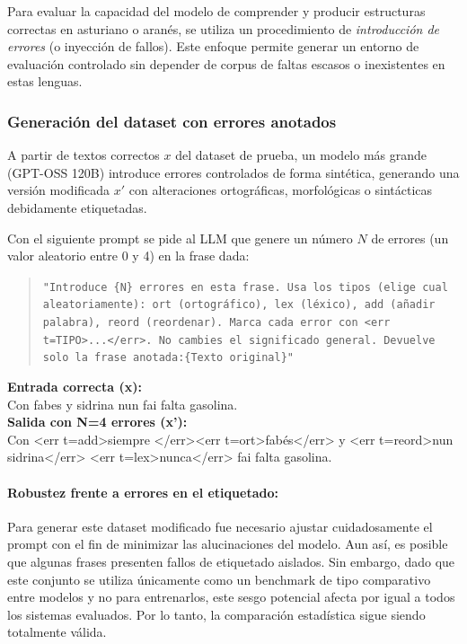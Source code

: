 Para evaluar la capacidad del modelo de comprender y producir estructuras correctas en asturiano o aranés, se utiliza un procedimiento de \emph{introducción de errores} (o inyección de fallos). Este enfoque permite generar un entorno de evaluación controlado sin depender de corpus de faltas escasos o inexistentes en estas lenguas.

\subsubsection{Generación del dataset con errores anotados} 

A partir de textos correctos $x$ del dataset de prueba, un modelo más grande (GPT-OSS 120B) \cite{openai2025gptoss120bgptoss20bmodel} introduce errores controlados de forma sintética, generando una versión modificada $x'$ con alteraciones ortográficas, morfológicas o sintácticas debidamente etiquetadas.

Con el siguiente prompt se pide al LLM que genere un número $N$ de errores (un valor aleatorio entre 0 y 4) en la frase dada:

\begin{quote}
\texttt{"Introduce \{N\} errores en esta frase. Usa los tipos (elige cual aleatoriamente): ort (ortográfico), lex (léxico), add (añadir palabra), reord (reordenar). Marca cada error con <err t=TIPO>...</err>. No cambies el significado general. Devuelve solo la frase anotada:\{Texto original\}"}
\end{quote}

\begin{tcolorbox}[colback=gray!5,colframe=gray!40, title={Ejemplo de transformación con \emph{error injection}}]
\textbf{Entrada correcta (x):}\\
Con fabes y sidrina nun fai falta gasolina.\\

\textbf{Salida con N=4 errores (x'):}\\
Con <err t=add>siempre </err><err t=ort>fabés</err> y <err t=reord>nun sidrina</err> <err t=lex>nunca</err> fai falta gasolina.
\end{tcolorbox}

\paragraph{Robustez frente a errores en el etiquetado:} Para generar este dataset modificado fue necesario ajustar cuidadosamente el prompt con el fin de minimizar las alucinaciones del modelo. Aun así, es posible que algunas frases presenten fallos de etiquetado aislados. Sin embargo, dado que este conjunto se utiliza únicamente como un benchmark de tipo comparativo entre modelos y no para entrenarlos, este sesgo potencial afecta por igual a todos los sistemas evaluados. Por lo tanto, la comparación estadística sigue siendo totalmente válida.

